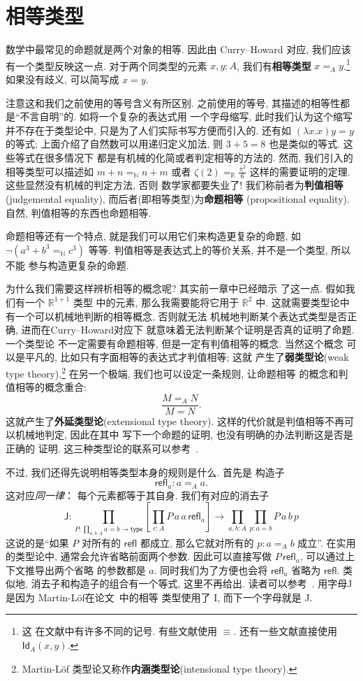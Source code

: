 \documentclass[UTF8]{ctexbook}
\newcommand{\cons}[1]{\textsf{#1}}
\theoremstyle{plain}
\theoremstyle{definition}
\theoremstyle{remark}
\begin{document}
\section{相等类型}
数学中最常见的命题就是两个对象的相等. 因此由 Curry--Howard
对应, 我们应该有一个类型反映这一点. 对于两个同类型的元素
\(x,y : A\), 我们有\textbf{相等类型} \(x =_A y\).\footnote{这
在文献中有许多不同的记号. 有些文献使用 \(\equiv\).
还有一些文献直接使用 \(\cons{Id}_A(x,y)\).}
如果没有歧义, 可以简写成 \(x = y\).

注意这和我们之前使用的等号含义有所区别. 之前使用的等号,
其描述的相等性都是“不言自明”的. 如将一个复杂的表达式用
一个字母缩写, 此时我们认为这个缩写并不存在于类型论中,
只是为了人们实际书写方便而引入的. 还有如 \((\lambda x.x)y = y\)
的等式; 上面介绍了自然数可以用递归定义加法, 则
\(3 + 5 = 8\) 也是类似的等式. 这些等式在很多情况下
都是有机械的化简或者判定相等的方法的. 然而, 我们引入的
相等类型可以描述如 \(m + n =_{\mathbb N} n + m\) 或者 \(\zeta(2) =_{\mathbb R} \frac{\pi^2}{6}\)
这样的需要证明的定理. 这些显然没有机械的判定方法, 否则
数学家都要失业了!
我们称前者为\textbf{判值相等} (judgemental equality),
而后者(即相等类型)为\textbf{命题相等} (propositional equality).
自然, 判值相等的东西也命题相等.

命题相等还有一个特点, 就是我们可以用它们来构造更复杂的命题,
如 \(\neg (a^3 + b^3 =_{\mathbb N} c^3)\) 等等.
判值相等是表达式上的等价关系, 并不是一个类型, 所以不能
参与构造更复杂的命题.

为什么我们需要这样辨析相等的概念呢? 其实前一章中已经暗示
了这一点. 假如我们有一个 \(\mathbb R^{1+1}\) 类型
中的元素, 那么我需要能将它用于 \(\mathbb R^2\) 中.
这就需要类型论中有一个可以机械地判断的相等概念, 否则就无法
机械地判断某个表达式类型是否正确, 进而在Curry--Howard对应下
就意味着无法判断某个证明是否真的证明了命题. 一个类型论
不一定需要有命题相等, 但是一定有判值相等的概念. 当然这个概念
可以是平凡的, 比如只有字面相等的表达式才判值相等; 这就
产生了\textbf{弱类型论}(weak type theory).\footnote{Martin-L\"of
类型论又称作\textbf{内涵类型论}(intensional
type theory).} 在另一个极端, 我们也可以设定一条规则, 让命题相等
的概念和判值相等的概念重合:
\[\frac{M =_A N}{M = N}.\]
这就产生了\textbf{外延类型论}(extensional type theory).
这样的代价就是判值相等不再可以机械地判定, 因此在其中
写下一个命题的证明, 也没有明确的办法判断这是否是正确的
证明. 这三种类型论的联系可以参考~\cite{winterhalter:2018:ettwtt}.

不过, 我们还得先说明相等类型本身的规则是什么. 首先是
构造子
\[\cons{refl}_a : a =_A a.\]
这对应\emph{同一律}： 每个元素都等于其自身.
我们有对应的消去子
\[\cons{J} :
\prod_{P : \prod_{a,b:A} a = b \to \cons{type}}
\left[\prod_{c : A} P\,a\,a\,\cons{refl}_a\right] \to \prod_{a,b:A}\prod_{p : a=b} P\,a\,b\,p\]
这说的是“如果 \(P\) 对所有的 \(\cons{refl}\) 都成立,
那么它就对所有的 \(p : a=_A b\) 成立”.
在实用的类型论中, 通常会允许省略前面两个参数. 因此可以直接写做
\(P\,\cons{refl}_a\), 可以通过上下文推导出两个省略
的参数都是 \(a\). 同时我们为了方便也会将
\(\cons{refl}_a\) 省略为 \(\cons{refl}\).
类似地, 消去子和构造子的组合有一个等式, 这里不再给出.
读者可以参考~\cite{ufp:2013:hottbook}. 用字母J是因为
Martin-L\"of在论文~\cite{martinlof:1984:J}中的相等
类型使用了 I, 而下一个字母就是 J.
\end{document}
